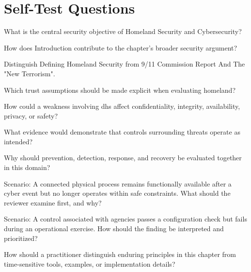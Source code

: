 \documentclass[11pt,letterpaper]{article}
\begin{document}
\section*{Self-Test Questions}
\begin{CornellRecallList}
\item What is the central security objective of Homeland Security and Cybersecurity?
\item How does Introduction contribute to the chapter's broader security argument?
\item Distinguish Defining Homeland Security from 9/11 Commission Report And The "New Terrorism".
\item Which trust assumptions should be made explicit when evaluating homeland?
\item How could a weakness involving dhs affect confidentiality, integrity, availability, privacy, or safety?
\item What evidence would demonstrate that controls surrounding threats operate as intended?
\item Why should prevention, detection, response, and recovery be evaluated together in this domain?
\item Scenario: A connected physical process remains functionally available after a cyber event but no longer operates within safe constraints. What should the reviewer examine first, and why?
\item Scenario: A control associated with agencies passes a configuration check but fails during an operational exercise. How should the finding be interpreted and prioritized?
\item How should a practitioner distinguish enduring principles in this chapter from time-sensitive tools, examples, or implementation details?
\end{CornellRecallList}
\end{document}
